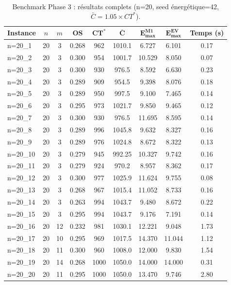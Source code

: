 \documentclass{article}
\begin{document}
\begin{table}[h!]
\centering
\scriptsize
\begin{tabular}{l c c c c c c c c}
\toprule
\textbf{Instance} & $n$ & $m$ & \textbf{OS} & $\boldsymbol{CT^*}$ & $\boldsymbol{\bar{C}}$ & $\boldsymbol{E_{\max}^{\text{M1}}}$ & $\boldsymbol{E_{\max}^{\text{EV}}}$ & \textbf{Temps (s)} \\
\midrule
n=20\_1  & 20 & 3 & 0.268 & 962 & 1010.1 & 6.727 & 6.101 & 0.17 \\
n=20\_2  & 20 & 3 & 0.300 & 954 & 1001.7 & 10.529 & 8.050 & 0.07 \\
n=20\_3  & 20 & 3 & 0.300 & 930 & 976.5 & 8.592 & 6.630 & 0.23 \\
n=20\_4  & 20 & 3 & 0.289 & 909 & 954.5 & 9.398 & 8.076 & 0.18 \\
n=20\_5  & 20 & 3 & 0.289 & 950 & 997.5 & 9.100 & 7.465 & 0.14 \\
n=20\_6  & 20 & 3 & 0.295 & 973 & 1021.7 & 9.850 & 9.465 & 0.12 \\
n=20\_7  & 20 & 3 & 0.300 & 930 & 976.5 & 11.695 & 8.595 & 0.14 \\
n=20\_8  & 20 & 3 & 0.289 & 996 & 1045.8 & 9.632 & 8.327 & 0.16 \\
n=20\_9  & 20 & 3 & 0.289 & 976 & 1024.8 & 8.672 & 8.322 & 0.13 \\
n=20\_10 & 20 & 3 & 0.279 & 945 & 992.25 & 10.327 & 9.742 & 0.16 \\
n=20\_11 & 20 & 3 & 0.279 & 924 & 970.2 & 8.957 & 8.362 & 0.17 \\
n=20\_12 & 20 & 3 & 0.300 & 977 & 1025.9 & 11.624 & 9.755 & 0.08 \\
n=20\_13 & 20 & 3 & 0.268 & 967 & 1015.4 & 11.052 & 8.733 & 0.16 \\
n=20\_14 & 20 & 3 & 0.263 & 994 & 1043.7 & 9.480 & 8.672 & 0.22 \\
n=20\_15 & 20 & 3 & 0.295 & 994 & 1043.7 & 9.176 & 7.191 & 0.14 \\
n=20\_16 & 20 & 12 & 0.232 & 981 & 1030.1 & 12.221 & 9.048 & 1.73 \\
n=20\_17 & 20 & 10 & 0.295 & 969 & 1017.5 & 14.370 & 11.044 & 1.12 \\
n=20\_18 & 20 & 11 & 0.300 & 960 & 1008.0 & 12.000 & 9.830 & 1.54 \\
n=20\_19 & 20 & 14 & 0.268 & 1000 & 1050.0 & 14.000 & 14.000 & 0.31 \\
n=20\_20 & 20 & 11 & 0.295 & 1000 & 1050.0 & 13.470 & 9.746 & 2.80 \\
\bottomrule
\end{tabular}
\caption{Benchmark Phase 3 : résultats complets (n=20, seed énergétique=42, $\bar{C} = 1.05 \times CT^*$).}
\label{tab:phase3_benchmark}
\end{table}
\end{document}
